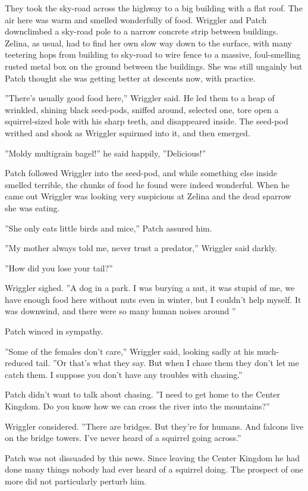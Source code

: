 \documentclass[12pt]{book}
\begin{document}
They took the sky-road across the highway to a big building with a flat roof. The air here was warm and smelled wonderfully of food. Wriggler and Patch downclimbed a sky-road pole to a narrow concrete strip between buildings. Zelina, as usual, had to find her own slow way down to the surface, with many teetering hops from building to sky-road to wire fence to a massive, foul-smelling rusted metal box on the ground between the buildings. She was still ungainly but Patch thought she was getting better at descents now, with practice.\par
''There's usually good food here,'' Wriggler said. He led them to a heap of wrinkled, shining black seed-pods, sniffed around, selected one, tore open a squirrel-sized hole with his sharp teeth, and disappeared inside. The seed-pod writhed and shook as Wriggler squirmed into it, and then emerged.\par
 ''Moldy multigrain bagel!'' he said happily, ''Delicious!''\par
 Patch followed Wriggler into the seed-pod, and while something else inside smelled terrible, the chunks of food he found were indeed wonderful. When he came out Wriggler was looking very suspicious at Zelina and the dead sparrow she was eating.\par
 ''She only eats little birds and mice,'' Patch assured him.\par
 ''My mother always told me, never trust a predator,'' Wriggler said darkly.\par
 ''How did you lose your tail?''\par
 Wriggler sighed. ''A dog in a park. I was burying a nut, it was stupid of me, we have enough food here without nuts even in winter, but I couldn't help myself. It was downwind, and there were so many human noises around%
''\par
 Patch winced in sympathy.\par
 ''Some of the females don't care,'' Wriggler said, looking sadly at his much-reduced tail. ''Or that's what they say. But when I chase them they don't let me catch them. I suppose you don't have any troubles with chasing.''\par
 Patch didn't want to talk about chasing. ''I need to get home to the Center Kingdom. Do you know how we can cross the river into the mountains?''\par
 Wriggler considered. ''There are bridges. But they're for humans. And falcons live on the bridge towers. I've never heard of a squirrel going across.''\par
 Patch was not dissuaded by this news. Since leaving the Center Kingdom he had done many things nobody had ever heard of a squirrel doing. The prospect of one more did not particularly perturb him.\par
\end{document}
